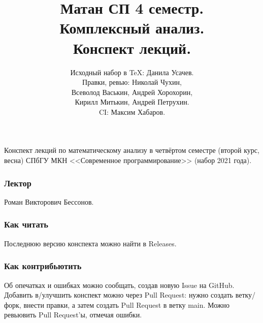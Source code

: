 \documentclass[a4paper,14pt]{extarticle}
\title{Матан СП 4 семестр. \\ Комплексный анализ. \\ Конспект лекций.}
\author{Исходный набор в \TeX: Данила Усачев. \\ Правки, ревью: Николай Чухин, \\ Всеволод Васькин, Андрей Хорохорин, \\ Кирилл Митькин, Андрей Петрухин. \\ CI: Максим Хабаров.}
\theoremstyle{definition}
\theoremstyle{plain}
\theoremstyle{plain}
\theoremstyle{plain}
\theoremstyle{plain}
\theoremstyle{definition}
\theoremstyle{definition}
\theoremstyle{definition}
\theoremstyle{definition}
\theoremstyle{definition}
\theoremstyle{definition}
\theoremstyle{definition}
\theoremstyle{definition}
\theoremstyle{definition}
\theoremstyle{definition}
\theoremstyle{definition}
\theoremstyle{plain}
\theoremstyle{plain}
\theoremstyle{plain}
\theoremstyle{plain}
\theoremstyle{definition}
\theoremstyle{definition}
\theoremstyle{definition}
\theoremstyle{definition}
\theoremstyle{definition}
\theoremstyle{definition}
\begin{document}
\maketitle
Конспект лекций по математическому анализу в четвёртом семестре (второй курс, весна) СПбГУ МКН <<Современное программирование>> (набор 2021 года).
\subsubsection*{Лектор}
Роман Викторович Бессонов.
\subsubsection*{Как читать}
Последнюю версию конспекта можно найти в Releases.
\subsubsection*{Как контрибьютить}
Об опечатках и ошибках можно сообщать, создав новую Issue на GitHub.
Добавить в/улучшить конспект можно через Pull Request: нужно создать ветку/форк, внести правки, а затем создать Pull Request в ветку main.
Можно ревьювить Pull Request'ы, отмечая ошибки.
\newpage
\tableofcontents
\newpage














\end{document}
